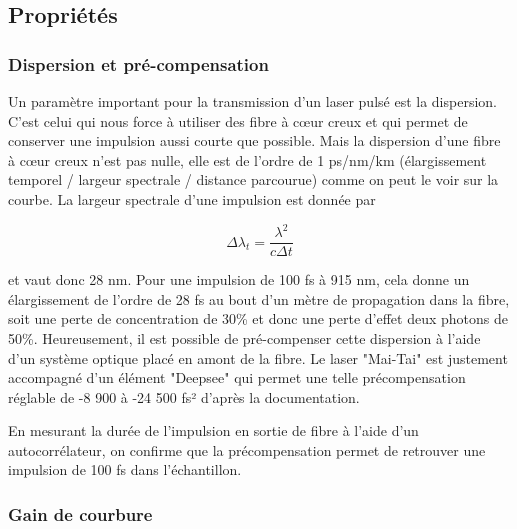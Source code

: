 \subsection{Propriétés}


\subsubsection{Dispersion et pré-compensation}

Un paramètre important pour la transmission d'un laser pulsé est la dispersion. C'est celui qui nous force à utiliser des fibre à cœur creux et qui permet de conserver une impulsion aussi courte que possible. Mais la dispersion d'une fibre à cœur creux n'est pas nulle, elle est de l'ordre de 1 ps/nm/km (élargissement temporel / largeur spectrale / distance parcourue) comme on peut le voir sur la courbe. La largeur spectrale d'une impulsion est donnée par

$$
\Delta \lambda_t = \frac{\lambda^2}{c\Delta t}
$$

et vaut donc 28 nm. Pour une impulsion de 100 fs à 915 nm, cela donne un élargissement de l'ordre de 28 fs au bout d'un mètre de propagation dans la fibre, soit une perte de concentration de 30\% et donc une perte d'effet deux photons de 50\%. Heureusement, il est possible de pré-compenser cette dispersion à l'aide d'un système optique placé en amont de la fibre. Le laser "Mai-Tai" est justement accompagné d'un élément "Deepsee" qui permet une telle précompensation réglable de -8 900 à -24 500 fs² d'après la documentation.


En mesurant la durée de l'impulsion en sortie de fibre à l'aide d'un autocorrélateur, on confirme que la précompensation permet de retrouver une impulsion de 100 fs dans l'échantillon.

\subsubsection{Gain de courbure}


